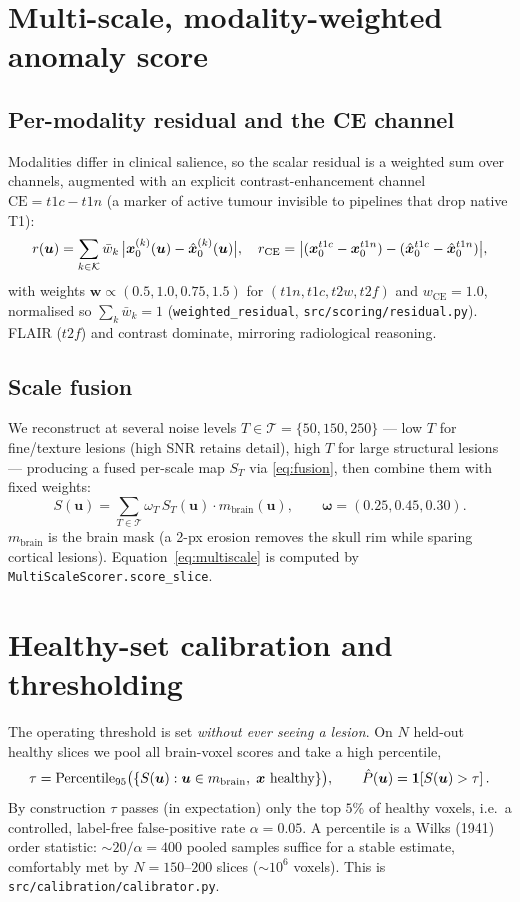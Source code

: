 \section{Multi-scale, modality-weighted anomaly score}
\subsection{Per-modality residual and the CE channel}
Modalities differ in clinical salience, so the scalar residual is a weighted sum
over channels, augmented with an explicit contrast-enhancement channel
$\mathrm{CE}=t1c-t1n$ (a marker of active tumour invisible to pipelines that drop
native T1):
\begin{equation}
r(\bm u)=\sum_{k\in\mathcal K}\bar w_k\,\big|\bm{x}_0^{(k)}(\bm u)-\hat{\bm{x}}_0^{(k)}(\bm u)\big|,
\quad
r_{\mathrm{CE}}=\big|(\bm{x}_0^{t1c}-\bm{x}_0^{t1n})-(\hat{\bm{x}}_0^{t1c}-\hat{\bm{x}}_0^{t1n})\big|,
\label{eq:residual}
\end{equation}
with weights $\bm w\propto(0.5,1.0,0.75,1.5)$ for $(t1n,t1c,t2w,t2f)$ and
$w_{\mathrm{CE}}=1.0$, normalised so $\sum_k\bar w_k=1$
(\texttt{weighted\_residual}, \texttt{src/scoring/residual.py}). FLAIR ($t2f$) and
contrast dominate, mirroring radiological reasoning.

\subsection{Scale fusion}
We reconstruct at several noise levels $T\in\mathcal T=\{50,150,250\}$ ---
low $T$ for fine/texture lesions (high SNR retains detail), high $T$ for large
structural lesions --- producing a fused per-scale map $S_T$ via
\eqref{eq:fusion}, then combine them with fixed weights:
\begin{equation}
\boxed{\;S(\bm u)=\sum_{T\in\mathcal T}\omega_T\,S_T(\bm u)\cdot m_{\text{brain}}(\bm u),
\qquad \bm\omega=(0.25,0.45,0.30).\;}
\label{eq:multiscale}
\end{equation}
$m_{\text{brain}}$ is the brain mask (a 2-px erosion removes the skull rim while
sparing cortical lesions). Equation~\eqref{eq:multiscale} is computed by
\texttt{MultiScaleScorer.score\_slice}.

\section{Healthy-set calibration and thresholding}
The operating threshold is set \emph{without ever seeing a lesion}. On $N$
held-out healthy slices we pool all brain-voxel scores and take a high
percentile,
\begin{equation}
\tau=\mathrm{Percentile}_{95}\big(\{S(\bm u):\bm u\in m_{\text{brain}},\;\bm{x}\text{ healthy}\}\big),
\qquad \hat P(\bm u)=\mathbf 1\!\left[S(\bm u)>\tau\right].
\label{eq:tau}
\end{equation}
By construction $\tau$ passes (in expectation) only the top $5\%$ of healthy
voxels, i.e.\ a controlled, label-free false-positive rate $\alpha=0.05$. A
percentile is a Wilks (1941) order statistic: $\sim20/\alpha=400$ pooled samples
suffice for a stable estimate, comfortably met by $N=150$--$200$ slices
($\sim10^6$ voxels). This is \texttt{src/calibration/calibrator.py}.


